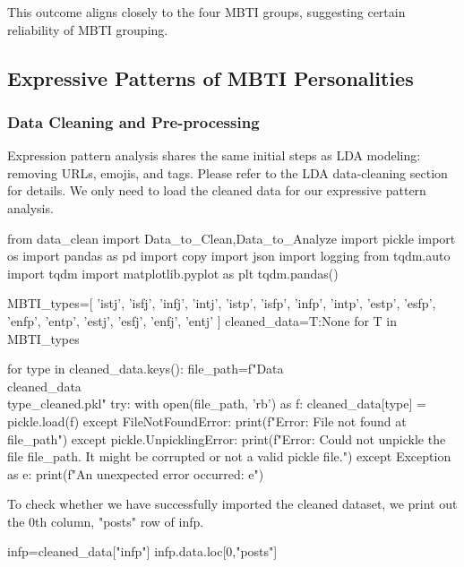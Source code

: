 \documentclass[12pt]{article}
\numberwithin{figure}{section}  %
\begin{document}
	This outcome aligns closely to the four MBTI groups, suggesting certain
	reliability of MBTI grouping.
	
	\subsection{Expressive Patterns of MBTI Personalities}
	\subsubsection{Data Cleaning and Pre-processing}
	Expression pattern analysis shares the same initial steps as LDA modeling:
	removing URLs, emojis, and tags. Please refer to the LDA data-cleaning %
	section for details. We only need to load the cleaned data for our
	expressive pattern analysis.
	\begin{python}
from data_clean import Data_to_Clean,Data_to_Analyze
import pickle
import os
import pandas as pd
import copy
import json
import logging
from tqdm.auto import tqdm
import matplotlib.pyplot as plt
tqdm.pandas()

MBTI_types=[
    'istj', 'isfj', 'infj', 'intj', 
    'istp', 'isfp', 'infp', 'intp', 
    'estp', 'esfp', 'enfp', 'entp', 
    'estj', 'esfj', 'enfj', 'entj'
    ]
cleaned_data={T:None for T in MBTI_types}

for type in cleaned_data.keys():
    file_path=f"Data\\cleaned_data\\{type}_cleaned.pkl" 
    try:
        with open(file_path, 'rb') as f:
            cleaned_data[type] = pickle.load(f)
    except FileNotFoundError:
        print(f"Error: File not found at {file_path}")
    except pickle.UnpicklingError:
        print(f"Error: Could not unpickle the file {file_path}. It might be corrupted or not a valid pickle file.")
    except Exception as e:
        print(f"An unexpected error occurred: {e}")
	\end{python}
	
	To check whether we have successfully imported the cleaned dataset, we print
	out the 0th column,  "posts" row of infp. %
	\begin{python}
infp=cleaned_data["infp"]
infp.data.loc[0,"posts"]
	\end{python}
	
\end{document}
